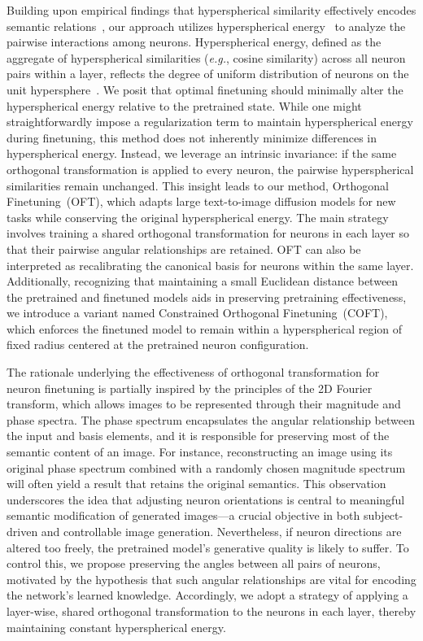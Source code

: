 Building upon empirical findings that hyperspherical similarity effectively encodes semantic relations~\cite{liu2017deep,liu2018decoupled,chen2020angular}, our approach utilizes hyperspherical energy~\cite{liu2018learning} to analyze the pairwise interactions among neurons. Hyperspherical energy, defined as the aggregate of hyperspherical similarities (\emph{e.g.}, cosine similarity) across all neuron pairs within a layer, reflects the degree of uniform distribution of neurons on the unit hypersphere~\cite{liu2021learning}. We posit that optimal finetuning should minimally alter the hyperspherical energy relative to the pretrained state. While one might straightforwardly impose a regularization term to maintain hyperspherical energy during finetuning, this method does not inherently minimize differences in hyperspherical energy. Instead, we leverage an intrinsic invariance: if the same orthogonal transformation is applied to every neuron, the pairwise hyperspherical similarities remain unchanged. This insight leads to our method, Orthogonal Finetuning~(OFT), which adapts large text-to-image diffusion models for new tasks while conserving the original hyperspherical energy. The main strategy involves training a shared orthogonal transformation for neurons in each layer so that their pairwise angular relationships are retained. OFT can also be interpreted as recalibrating the canonical basis for neurons within the same layer. Additionally, recognizing that maintaining a small Euclidean distance between the pretrained and finetuned models aids in preserving pretraining effectiveness, we introduce a variant named Constrained Orthogonal Finetuning~(COFT), which enforces the finetuned model to remain within a hyperspherical region of fixed radius centered at the pretrained neuron configuration.

The rationale underlying the effectiveness of orthogonal transformation for neuron finetuning is partially inspired by the principles of the 2D Fourier transform, which allows images to be represented through their magnitude and phase spectra. The phase spectrum encapsulates the angular relationship between the input and basis elements, and it is responsible for preserving most of the semantic content of an image. For instance, reconstructing an image using its original phase spectrum combined with a randomly chosen magnitude spectrum will often yield a result that retains the original semantics. This observation underscores the idea that adjusting neuron orientations is central to meaningful semantic modification of generated images—a crucial objective in both subject-driven and controllable image generation. Nevertheless, if neuron directions are altered too freely, the pretrained model’s generative quality is likely to suffer. To control this, we propose preserving the angles between all pairs of neurons, motivated by the hypothesis that such angular relationships are vital for encoding the network’s learned knowledge. Accordingly, we adopt a strategy of applying a layer-wise, shared orthogonal transformation to the neurons in each layer, thereby maintaining constant hyperspherical energy.

